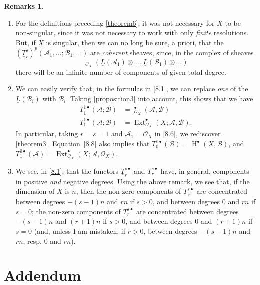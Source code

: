 \documentclass{article}
\theoremstyle{plain}
\theoremstyle{definition}
\newtheorem*{remarks}{Remarks}
\newcommand{\sh}{\mathscr}
\DeclareMathOperator{\Ext}{Ext}
\DeclareMathOperator{\shExt}{\underline{Ext}}
\DeclareMathOperator{\shHom}{\underline{Hom}}
\DeclareMathOperator{\HH}{H}
\newcommand{\oldpage}[1]{\marginpar{\footnotesize$\Big\vert$ \textit{p.~#1}}}
\begin{document}
\oldpage{149-24}
\begin{remarks}
  \begin{enumerate}
    \item For the definitions preceding \cref{theorem6}, it was not necessary for $X$ to be non-singular, since it was not necessary to work with only \emph{finite} resolutions.
      But, if $X$ is singular, then we can no long be sure, a priori, that the $(\underline{T}_r^s)^p(\sh{A}_1,\ldots;\sh{B}_1,\ldots)$ are \emph{coherent} sheaves, since, in the complex of sheaves
      \[
        \shHom_{\sh{O}_X}(\underline{L}(\sh{A}_1)\otimes\ldots,\underline{L}(\sh{B}_1)\otimes\ldots)
      \]
      there will be an infinite number of components of given total degree.
    \item We can easily verify that, in the formulas in \cref{8.1}, we can replace \emph{one} of the $\underline{L}(\sh{B}_i)$ with $\sh{B}_i$.
      Taking \cref{proposition3} into account, this shows that we have
      \[
      \label{8.8}
        \begin{aligned}
          \underline{T}_1^{1\bullet}(\sh{A};\sh{B})
          &= \shExt_{\sh{O}_X}^\bullet(\sh{A},\sh{B})
        \\T_1^{1\bullet}(\sh{A};\sh{B})
          &= \Ext_{\sh{O}_X}^\bullet(X;\sh{A},\sh{B}).
        \end{aligned}
      \tag{8.8}
      \]
      In particular, taking $r=s=1$ and $\sh{A}_1=\sh{O}_X$ in \cref{8.6}, we rediscover \cref{theorem3}.
      Equation~\cref{8.8} also implies that $T_0^{1\bullet}(\sh{B})=\HH^\bullet(X,\sh{B})$, and $T_1^{0\bullet}(\sh{A})=\Ext_{\sh{O}_X}^\bullet(X;\sh{A},\sh{O}_X)$.
    \item We see, in \cref{8.1}, that the functors $\underline{T}_r^{s\bullet}$ and $T_r^{s\bullet}$ have, in general, components in positive \emph{and} negative degrees.
      Using the above remark, we see that, if the dimension of $X$ is $n$, then the non-zero components of $\underline{T}_r^{s\bullet}$ are concentrated between degrees $-(s-1)n$ and $rn$ if $s>0$, and between degrees $0$ and $rn$ if $s=0$; the non-zero components of $T_r^{s\bullet}$ are concentrated between degrees $-(s-1)n$ and $(r+1)n$ if $s>0$, and between degrees $0$ and $(r+1)n$ if $s=0$ (and, unless I am mistaken, if $r>0$, between degrees $-(s-1)n$ and $rn$, resp. $0$ and $rn$).
  \end{enumerate}
\end{remarks}


\section*{Addendum}
\label{addendum}
\end{document}

